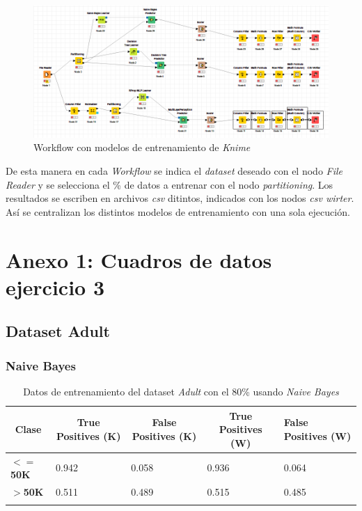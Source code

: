 \documentclass[10pt,a4paper]{article}
\begin{document}
\begin{figure}[h!]
	\centering
	\includegraphics[scale=0.5]{images/workflow_ej3_knime.png}
	\caption{Workflow con modelos de entrenamiento de \textit{Knime}}
	\label{fig:workflow_knime}
\end{figure}
De esta manera en cada \textit{Workflow} se indica el \textit{dataset} deseado con el nodo \textit{File Reader} y se selecciona el \% de datos a entrenar con el nodo \textit{partitioning}. Los resultados se escriben en archivos \textit{csv} ditintos, indicados con los nodos \textit{csv wirter}. Así se centralizan los distintos modelos de entrenamiento con una sola ejecución.
\newpage
\section{Anexo 1: Cuadros de datos ejercicio 3}

\subsection{Dataset Adult}

\subsubsection{Naive Bayes}
\begin{table}[h]
\begin{tabular}{lllll}
\hline
\multicolumn{1}{|c|}{\textbf{Clase}} & \multicolumn{1}{c|}{\textbf{True Positives (K)}} & \multicolumn{1}{c|}{\textbf{False Positives (K)}} & \multicolumn{1}{c|}{\textbf{True Positives (W)}} & \multicolumn{1}{l|}{\textbf{False Positives (W)}} \\ \hline
\multicolumn{1}{|l|}{\textbf{$<=$50K}} & \multicolumn{1}{l|}{0.942}          & \multicolumn{1}{l|}{0.058}          & \multicolumn{1}{l|}{0.936}          & \multicolumn{1}{l|}{0.064} \\ \hline
\multicolumn{1}{|l|}{\textbf{$>$50K}} & \multicolumn{1}{l|}{0.511}          & \multicolumn{1}{l|}{0.489}          & \multicolumn{1}{l|}{0.515}          & \multicolumn{1}{l|}{0.485} \\ \hline
\textbf{}                       &                                &                                &                                &                      
\end{tabular}
\caption{Datos de entrenamiento del dataset \emph{Adult} con el 80\% usando \emph{Naive Bayes}}
\label{tab:adult_bayes_80}
\end{table}
\end{document}
